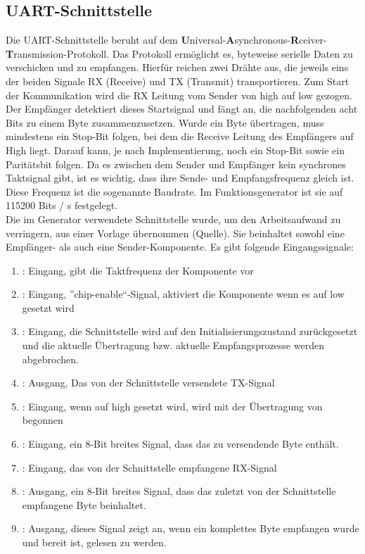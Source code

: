 \subsection{UART-Schnittstelle}
Die UART-Schnittstelle beruht auf dem
\textbf{U}niversal-\textbf{A}synchronous-\textbf{R}ceiver-\textbf{T}ransmission-Protokoll.
Das Protokoll ermöglicht es, byteweise serielle Daten zu verschicken und zu
empfangen. Hierfür reichen zwei Drähte aus, die jeweils eins der beiden Signale
RX (Receive) und TX (Transmit) transportieren. Zum Start der Kommunikation wird
die RX Leitung vom Sender von high auf low gezogen. Der Empfänger detektiert
dieses Startsignal und fängt an, die nachfolgenden acht Bits zu einem Byte
zusammenzusetzen.
Wurde ein Byte übertragen, muss mindestens ein Stop-Bit folgen, bei dem die Receive Leitung des Empfängers auf
High liegt. Darauf kann, je nach Implementierung, noch ein Stop-Bit sowie
ein Paritätsbit folgen. Da es zwischen dem Sender und Empfänger kein synchrones
Taktsignal gibt, ist es wichtig, dass ihre Sende- und Empfangsfrequenz gleich
ist. Diese Frequenz ist die sogenannte Baudrate. Im Funktionsgenerator ist sie
auf 115200 Bits / s festgelegt. \\
Die im Generator verwendete Schnittstelle wurde,
um den Arbeitsaufwand zu verringern, aus einer Vorlage übernommen (Quelle). Sie
beinhaltet sowohl eine Empfänger- als auch eine Sender-Komponente. Es gibt
folgende Eingangssignale:
\begin{enumerate}
\item {}: Eingang, gibt die Taktfrequenz der Komponente vor
\item {}: Eingang, ''chip-enable``-Signal, aktiviert die Komponente wenn es auf
  low gesetzt wird
\item {}: Eingang, die Schnittstelle wird auf den Initialisierungszustand zurückgesetzt und die aktuelle Übertragung bzw. aktuelle Empfangsprozesse werden abgebrochen.

\item {}: Ausgang, Das von der Schnittstelle versendete TX-Signal 
  \item {}: Eingang, wenn  auf high gesetzt wird, wird mit der
    Übertragung von  begonnen
\item {}: Eingang, ein 8-Bit breites Signal, dass das zu versendende Byte enthält.

\item {}: Eingang, das von der Schnittstelle empfangene RX-Signal
\item {}: Ausgang, ein 8-Bit breites Signal, dass das zuletzt von der Schnittstelle empfangene Byte beinhaltet.
\item {}: Ausgang, dieses Signal zeigt an, wenn ein komplettes Byte
  empfangen wurde und bereit ist, gelesen zu werden.
\end{enumerate}
  
